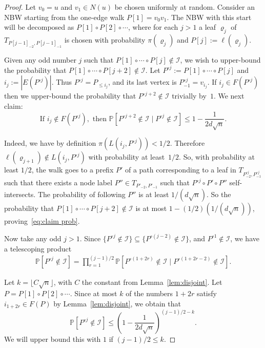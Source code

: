 \documentclass[11pt,a4paper]{article}
\theoremstyle{plain}
\def\calI{\mathcal{I}}
\def\nn{\sqrt{n}}
\let\rho=\varrho
\renewcommand{\Pr}{\mathbb{P}}
\begin{document}
\thmUB*
\begin{proof}
Let $v_0=u$ and $v_1\in N(u)$ be chosen uniformly at random.
Consider an NBW starting from the one-edge walk $P[1] = v_0 v_1$.   
The NBW with this start 
will be decomposed as $P[1] \circ P[2] \circ \cdots$, 
where for each $j>1$ a leaf $\rho_j$ of $T_{P[j-1]_{-2},P[j-1]_{-1}}$ is chosen with 
probability $\pi(\rho_j)$ and $P[j] := \ell(\rho_j)$. 

 Given any odd number $j$ such that $P[1] \circ \cdots \circ P[j]\notin \calI$,
we wish to upper-bound the probability that
$P[1] \circ \cdots \circ P[j+2] \notin \calI$. 
Let
$
P^{\circ j}:=P[1]\circ\cdots\circ P[j]
$
and 
$i_j:=|E(P^{\circ j})|$.
Thus $P^{\circ j}=P_{\le i_j}$, and its last vertex is
$P^{\circ j}_{-1}=v_{i_j}$.
If $i_j\in F(P^{\circ j})$ then we upper-bound the probability that $P^{\circ j+2} \notin \calI$ trivially by~$1$.
 We next claim:
\begin{equation}\label{eq:claim prob}
\text{If } 
i_j\notin F(P^{\circ j}),
\text{ then } \Pr[P^{\circ j+2}\notin \calI \mid P^{\circ j}\notin \calI]\leq 1-\frac{1}{2d\sqrt{n}}.
\end{equation}



Indeed, we have by definition $\pi(L(i_j,P^{\circ j}))< 1/2$.
Therefore $\ell(\rho_{j+1})\notin L(i_j,P^{\circ j})$ with probability at least~$1/2$.
So, with probability at least $1/2$, the walk goes to a prefix $P'$  
of a path corresponding to a leaf in $T_{P^{\circ j}_{-2},P^{\circ j}_{-1}}$ such that there exists a node label $P'' \in T_{P'_{-2},P'_{-1}}$ such that $P^{\circ j} \circ P'\circ P''$ self-intersects.  
The probability of following $P''$ is 
at least $1/(d \sqrt{n})$. 
So the probability that 
$P[1] \circ \cdots \circ P[j+2] \notin \calI$ is at most $1-(1/2) (1/(d \sqrt{n}))$, proving~\eqref{eq:claim prob}.

Now take any odd $j>1$. Since $\{ P^{\circ j} \notin \calI \} \subseteq \{ P^{\circ (j-2)} \notin \calI \}$, and $P^{\circ 1} \notin \calI$, we have a telescoping product 
\begin{align*}
\Pr[P^{\circ j }\notin \calI]=\prod_{r=1}^{(j-1)/2} \Pr[P^{\circ(1+2r)}\notin \calI\mid P^{\circ(1+2r-2)}\notin \calI ].
\end{align*}

Let $k =  \lfloor C\sqrt{n} \rfloor $, with $C$ the constant from Lemma~\ref{lem:disjoint}. 
Let $P=P[1]\circ P[2]\circ \cdots$.
Since at most $k$ of the numbers $1+2r$ satisfy $i_{1+2r}\in F(P)$ by Lemma~\ref{lem:disjoint}, we obtain that 
\[
\Pr[P^{\circ j}\notin \calI]\leq \left(1-\frac{1}{2d\nn}\right)^{(j-1)/2-k}.
\]
We will upper bound this with $1$ if $(j-1)/2 \leq k$.
 

\end{proof}
\end{document}
